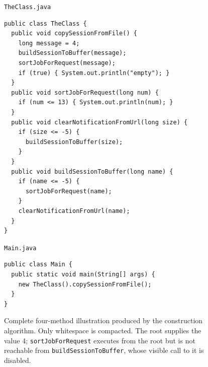 \begin{figure}[t]
\centering
\begin{minipage}{\columnwidth}
\footnotesize
\texttt{TheClass.java}
\begin{verbatim}
public class TheClass {
  public void copySessionFromFile() {
    long message = 4;
    buildSessionToBuffer(message);
    sortJobForRequest(message);
    if (true) { System.out.println("empty"); }
  }
  public void sortJobForRequest(long num) {
    if (num <= 13) { System.out.println(num); }
  }
  public void clearNotificationFromUrl(long size) {
    if (size <= -5) {
      buildSessionToBuffer(size);
    }
  }
  public void buildSessionToBuffer(long name) {
    if (name <= -5) {
      sortJobForRequest(name);
    }
    clearNotificationFromUrl(name);
  }
}
\end{verbatim}
\texttt{Main.java}
\begin{verbatim}
public class Main {
  public static void main(String[] args) {
    new TheClass().copySessionFromFile();
  }
}
\end{verbatim}
\end{minipage}
\caption{Complete four-method illustration produced by the construction algorithm. Only whitespace is compacted. The root supplies the value 4; \texttt{sortJobForRequest} executes from the root but is not reachable from \texttt{buildSessionToBuffer}, whose visible call to it is disabled.}
\label{fig:background-example}
\end{figure}
